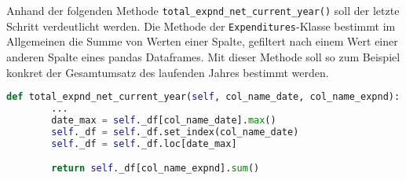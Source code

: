     

        

    

    Anhand der folgenden Methode \texttt{total\_expnd\_net\_current\_year()} soll der letzte Schritt verdeutlicht werden.
    Die Methode der \texttt{Expenditures}-Klasse bestimmt im Allgemeinen die Summe von Werten einer Spalte, gefiltert
    nach einem Wert einer anderen Spalte eines pandas Dataframes. Mit dieser Methode soll so zum Beispiel konkret der Gesamtumsatz des 
    laufenden Jahres bestimmt werden.

    \begin{lstlisting}[language=Python, caption=Beispiel Methode Expenditures class]
    def total_expnd_net_current_year(self, col_name_date, col_name_expnd):
        ... 
        date_max = self._df[col_name_date].max()        
        self._df = self._df.set_index(col_name_date)
        self._df = self._df.loc[date_max]

        return self._df[col_name_expnd].sum()  
    \end{lstlisting}

